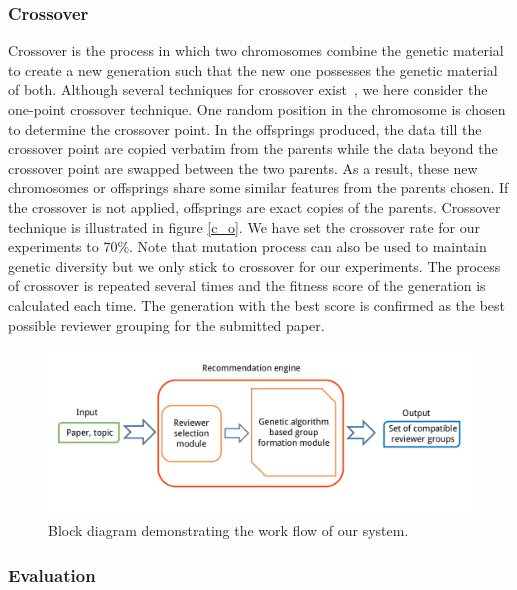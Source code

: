 \subsubsection*{Crossover}
Crossover is the process in which two chromosomes combine the genetic material to create a new generation such that the new one possesses the genetic material of both. 
Although several techniques for crossover exist~\cite{golberg1989genetic}, we here consider the one-point crossover technique. 
One random position in the chromosome is chosen to determine the crossover point. In the offsprings produced, the data till the crossover point are copied verbatim from the parents while the data beyond the crossover point are swapped between the two parents. As a result, these new chromosomes or
offsprings share some similar features from the parents chosen. If the crossover is not applied, offsprings are exact copies
of the parents. Crossover technique is illustrated in figure \ref{c_o}.
We have set the crossover rate for our experiments to 70\%. 
Note that mutation process can also be used to maintain genetic diversity but we only stick to crossover for our experiments. 
The process of crossover is repeated several times and the fitness score of the generation is calculated each time. The generation 
with the best score is confirmed as the best possible reviewer grouping for the submitted paper.

\begin{figure}
\centering
\includegraphics[scale=0.32]{./texfiles/Chapter_4/cikm_17/figures/r_d_g.pdf}
\caption{\label{r_d_g} Block diagram demonstrating the work flow of our system.}
\vspace{4mm}
\end{figure}

\subsubsection{Evaluation}

